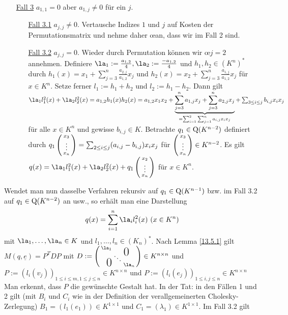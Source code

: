 \documentclass[../../main.tex]{subfiles}
\begin{document}
\begin{cproof}
\begin{itemize}
		\item[\underline{Fall 3}] $a_{1,1}=0$ aber $a_{1,j}\neq 0$ für ein $j$. 
		\begin{itemize}
			\item[\underline{Fall 3.1}] $a_{j,j}\neq 0$. Vertausche Indizes $1$ und $j$ auf Kosten der Permutationsmatrix und nehme daher \oe an, dass wir im Fall 2 sind.
			\item[\underline{Fall 3.2}] $a_{j,j}=0$. Wieder durch Permutation können wir \oe $j=2$ annehmen. Definiere $\la_1:=\frac{a_{1,2}}{4}, \la_2:=\frac{-a_{1,2}}{4}$ und $h_1,h_2\in (K^n)^*$ durch $h_1(x)=x_1+\sum_{j=3}^n\frac{a_{2,j}}{a_{1,2}}x_j$ und $h_2(x)=x_2+\sum_{j=3}^n\frac{a_{1,j}}{a_{1,2}}x_j$ für $x\in K^n$. Setze ferner $l_1:=h_1+h_2$ und $l_2:=h_1-h_2$. Dann gilt $\la_1 l_1^2(x)+\la_2l_2^2(x)=a_{1,2}h_1(x)h_2(x)=a_{1,2}x_1x_2+\underbrace{\sum_{j=3}^n a_{1,j} x_j+\sum_{j=3}^n a_{2,j}x_j}_{=\sum_{i=1}^2\sum_{j=1}^n a_{i,j}x_ix_j}+\sum_{3\le i\le j}b_{i,j}x_ix_j$ für alle $x\in K^n$ und gewisse $b_{i,j}\in K$. Betrachte $q_1\in \operatorname{Q}(K^{n-2})$ definiert durch  $q_1\left(\begin{smallmatrix}x_3\\\vdots\\x_n\end{smallmatrix}\right)=\sum_{2\le i\le j} (a_{i,j}-b_{i,j})x_ix_j$ für $\left(\begin{smallmatrix}x_3\\\vdots\\x_n\end{smallmatrix}\right)\in K^{n-2}$. Es gilt $q(x)=\la_1l_1^2(x)+\la_2l_2^2(x)+q_1\cvec{x_2\\\vdots\\x_n}$ für $x\in K^n$.\\
		\end{itemize}
	\end{itemize}
	Wendet man nun dasselbe Verfahren rekursiv auf $q_1\in \operatorname{Q}(K^{n-1})$ bzw. im Fall 3.2 auf $q_1\in \operatorname{Q}(K^{n-2})$ an usw., so erhält man eine Darstellung 
	\begin{align*}
		q(x)=\sum_{i=1}^n \la_il_i^2(x)\ (x\in K^n)
	\end{align*}	 
	mit $\la_1,\ldots ,\la_n\in K$ und $l_1,\ldots ,l_n\in (K_n)^*$. Nach Lemma \ref{13.5.1} gilt $M(q,\underline{e})=P^TDP$ mit $D:=\left(\begin{smallmatrix}
		\la_1 & & \llap{$\overset{\blap{\LARGE 0}}{~}$} \\
		& \ddots &\\
		\rlap{\tlap{\LARGE 0}} & & \la_n
	\end{smallmatrix}\right)\in K^{n\times n}$ und $P:=(l_i(v_j))_{1\le i\le m, 1\le j\le n}\in K^{n\times n}$ und $P:=(l_i(e_j))_{1\le i,j\le n}\in K^{n\times n}$ Man erkennt, dass $P$ die gewünschte Gestalt hat. In der Tat: in den Fällen 1 und 2 gilt (mit $B_i$ und $C_i$ wie in der Definition der verallgemeinerten Cholesky-Zerlegung) $B_1=(l_1(e_1))\in K^{1\times 1}$ und $C_1=(\lambda_1)\in K^{1\times 1}$. Im Fall 3.2 gilt

\end{cproof}
\end{document}
